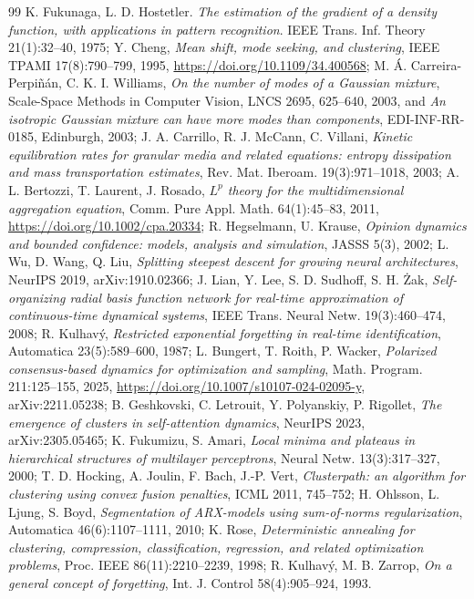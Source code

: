 \begin{thebibliography}{99}
K. Fukunaga, L. D. Hostetler.
\emph{The estimation of the gradient of a density function, with applications in pattern recognition}.
IEEE Trans. Inf. Theory 21(1):32--40, 1975;
Y. Cheng, \emph{Mean shift, mode seeking, and clustering}, IEEE TPAMI 17(8):790--799, 1995,
\url{https://doi.org/10.1109/34.400568};
M. \'A. Carreira-Perpi\~n\'an, C. K. I. Williams, \emph{On the number of modes of a Gaussian mixture}, Scale-Space
Methods in Computer Vision, LNCS 2695, 625--640, 2003, and \emph{An isotropic Gaussian mixture can have more modes
than components}, EDI-INF-RR-0185, Edinburgh, 2003;
J. A. Carrillo, R. J. McCann, C. Villani, \emph{Kinetic equilibration rates for granular media and related
equations: entropy dissipation and mass transportation estimates}, Rev. Mat. Iberoam. 19(3):971--1018, 2003;
A. L. Bertozzi, T. Laurent, J. Rosado, \emph{$L^p$ theory for the multidimensional aggregation equation}, Comm. Pure
Appl. Math. 64(1):45--83, 2011, \url{https://doi.org/10.1002/cpa.20334};
R. Hegselmann, U. Krause, \emph{Opinion dynamics and bounded confidence: models, analysis and simulation}, JASSS
5(3), 2002;
L. Wu, D. Wang, Q. Liu, \emph{Splitting steepest descent for growing neural architectures}, NeurIPS 2019,
arXiv:1910.02366;
J. Lian, Y. Lee, S. D. Sudhoff, S. H. \.Zak, \emph{Self-organizing radial basis function network for real-time
approximation of continuous-time dynamical systems}, IEEE Trans. Neural Netw. 19(3):460--474, 2008;
R. Kulhav\'y, \emph{Restricted exponential forgetting in real-time identification}, Automatica 23(5):589--600, 1987;
L. Bungert, T. Roith, P. Wacker, \emph{Polarized consensus-based dynamics for optimization and sampling}, Math.
Program. 211:125--155, 2025, \url{https://doi.org/10.1007/s10107-024-02095-y}, arXiv:2211.05238;
B. Geshkovski, C. Letrouit, Y. Polyanskiy, P. Rigollet, \emph{The emergence of clusters in self-attention dynamics},
NeurIPS 2023, arXiv:2305.05465;
K. Fukumizu, S. Amari, \emph{Local minima and plateaus in hierarchical structures of multilayer perceptrons}, Neural
Netw. 13(3):317--327, 2000;
T. D. Hocking, A. Joulin, F. Bach, J.-P. Vert, \emph{Clusterpath: an algorithm for clustering using convex fusion
penalties}, ICML 2011, 745--752;
H. Ohlsson, L. Ljung, S. Boyd, \emph{Segmentation of ARX-models using sum-of-norms regularization}, Automatica
46(6):1107--1111, 2010;
K. Rose, \emph{Deterministic annealing for clustering, compression, classification, regression, and related
optimization problems}, Proc. IEEE 86(11):2210--2239, 1998;
R. Kulhav\'y, M. B. Zarrop, \emph{On a general concept of forgetting}, Int. J. Control 58(4):905--924, 1993.


\end{thebibliography}
